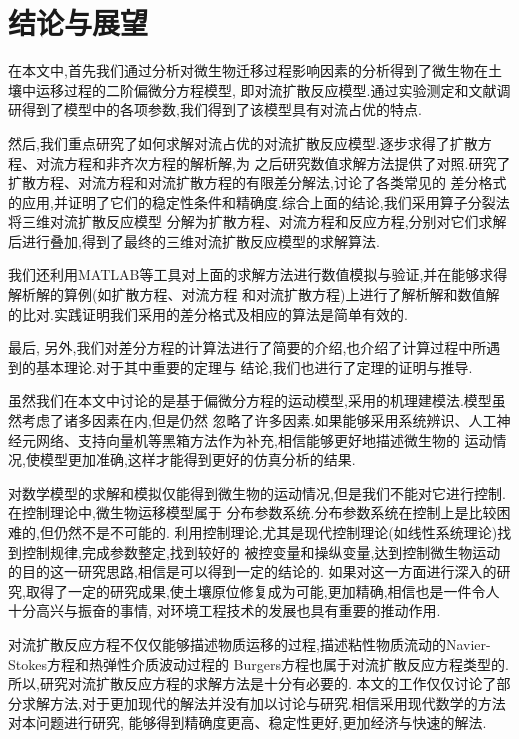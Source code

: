\chapter{结论与展望}
在本文中,首先我们通过分析对微生物迁移过程影响因素的分析得到了微生物在土壤中运移过程的二阶偏微分方程模型,
即对流扩散反应模型.通过实验测定和文献调研得到了模型中的各项参数,我们得到了该模型具有对流占优的特点.\par
然后,我们重点研究了如何求解对流占优的对流扩散反应模型.逐步求得了扩散方程、对流方程和非齐次方程的解析解,为
之后研究数值求解方法提供了对照.研究了扩散方程、对流方程和对流扩散方程的有限差分解法,讨论了各类常见的
差分格式的应用,并证明了它们的稳定性条件和精确度.综合上面的结论,我们采用算子分裂法将三维对流扩散反应模型
分解为扩散方程、对流方程和反应方程,分别对它们求解后进行叠加,得到了最终的三维对流扩散反应模型的求解算法.\par
我们还利用MATLAB等工具对上面的求解方法进行数值模拟与验证,并在能够求得解析解的算例(如扩散方程、对流方程
和对流扩散方程)上进行了解析解和数值解的比对.实践证明我们采用的差分格式及相应的算法是简单有效的.\par
最后,
另外,我们对差分方程的计算法进行了简要的介绍,也介绍了计算过程中所遇到的基本理论.对于其中重要的定理与
结论,我们也进行了定理的证明与推导.\par
虽然我们在本文中讨论的是基于偏微分方程的运动模型,采用的机理建模法.模型虽然考虑了诸多因素在内,但是仍然
忽略了许多因素.如果能够采用系统辨识、人工神经元网络、支持向量机等黑箱方法作为补充,相信能够更好地描述微生物的
运动情况,使模型更加准确,这样才能得到更好的仿真分析的结果.\par
对数学模型的求解和模拟仅能得到微生物的运动情况,但是我们不能对它进行控制.在控制理论中,微生物运移模型属于
分布参数系统.分布参数系统在控制上是比较困难的,但仍然不是不可能的.
利用控制理论,尤其是现代控制理论(如线性系统理论)找到控制规律,完成参数整定,找到较好的
被控变量和操纵变量,达到控制微生物运动的目的这一研究思路,相信是可以得到一定的结论的.
如果对这一方面进行深入的研究,取得了一定的研究成果,使土壤原位修复成为可能,更加精确,相信也是一件令人十分高兴与振奋的事情,
对环境工程技术的发展也具有重要的推动作用.\par
对流扩散反应方程不仅仅能够描述物质运移的过程,描述粘性物质流动的Navier-Stokes方程和热弹性介质波动过程的
Burgers方程也属于对流扩散反应方程类型的.所以,研究对流扩散反应方程的求解方法是十分有必要的.
本文的工作仅仅讨论了部分求解方法,对于更加现代的解法并没有加以讨论与研究.相信采用现代数学的方法对本问题进行研究,
能够得到精确度更高、稳定性更好,更加经济与快速的解法.